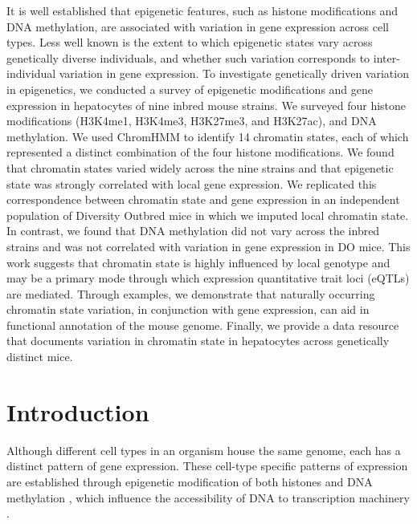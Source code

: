 \documentclass[
  11pt,
]{article}
\begin{document}
It is well established that epigenetic features, such as histone
modifications and DNA methylation, are associated with variation in gene
expression across cell types. Less well known is the extent to which
epigenetic states vary across genetically diverse individuals, and
whether such variation corresponds to inter-individual variation in gene
expression. To investigate genetically driven variation in epigenetics,
we conducted a survey of epigenetic modifications and gene expression in
hepatocytes of nine inbred mouse strains. We surveyed four histone
modifications (H3K4me1, H3K4me3, H3K27me3, and H3K27ac), and DNA
methylation. We used ChromHMM to identify 14 chromatin states, each of
which represented a distinct combination of the four histone
modifications. We found that chromatin states varied widely across the
nine strains and that epigenetic state was strongly correlated with
local gene expression. We replicated this correspondence between
chromatin state and gene expression in an independent population of
Diversity Outbred mice in which we imputed local chromatin state. In
contrast, we found that DNA methylation did not vary across the inbred
strains and was not correlated with variation in gene expression in DO
mice. This work suggests that chromatin state is highly influenced by
local genotype and may be a primary mode through which expression
quantitative trait loci (eQTLs) are mediated. Through examples, we
demonstrate that naturally occurring chromatin state variation, in
conjunction with gene expression, can aid in functional annotation of
the mouse genome. Finally, we provide a data resource that documents
variation in chromatin state in hepatocytes across genetically distinct
mice.

\hypertarget{introduction}{%
\section{Introduction}\label{introduction}}

Although different cell types in an organism house the same genome, each
has a distinct pattern of gene expression. These cell-type specific
patterns of expression are established through epigenetic modification
of both histones \citep{pmid32671792, pmid29625185} and DNA methylation
\citep{pmid21701563, pmid20720541}, which influence the accessibility of
DNA to transcription machinery
\citep{lawrence2016lateral, jones2012functions, moore2013dna}.
\end{document}

